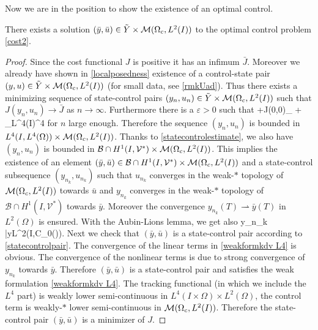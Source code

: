 Now we are in the position to show the existence of an optimal control.
\begin{proposition}
There exists a solution $(\bar y, \bar u)\in \tilde Y\times \mathcal{M}(\Omega_c, L^{2}(I)) $ to the optimal control problem \eqref{cost2}.
\end{proposition}
\begin{proof}
Since the cost functional $J$ is positive it has an infimum $\bar J$. Moreover we already have shown in \cref{localposedness} existence of a control-state pair $(y,u)\in \tilde Y\times \mathcal{M}(\Omega_c, L^{2}(I))$ (for small data, see \cref{rmkUad}). Thus there exists a minimizing sequence of state-control pairs $(y_n,u_n) \in \tilde Y\times \mathcal{M}(\Omega_c, L^{2}(I))$ such that $J(y_n, u_n) \rightarrow \bar J$ as $n \rightarrow \infty$. Furthermore there is a $\varepsilon>0$ such that
\be
\varepsilon+J(0,0)\geq \alpha {}_{\M} +  _{L^4(I\times \Omega)}^4
\ee
for $n$ large enough. Therefore the sequence $(y_n,u_n)$ is bounded in $L^4(I,L^4(\Omega))\times \mathcal{M}(\Omega_c, L^{2}(I))$. Thanks to \cref{statecontrolestimate}, we also have $(y_n,u_n)$ is bounded in $\mathcal{B}\cap H^{1}(I, \mathcal{V}^{*})\times \mathcal{M}(\Omega_c, L^{2}(I))$. This implies the existence of an element $(\bar y, \bar u)\in \mathcal{B}\cap H^{1}(I, \mathcal{V}^{*})\times \mathcal{M}(\Omega_c, L^{2}(I))$ and a state-control subsequence $(y_{n_k},u_{n_k})$ such that $u_{n_k}$ converges in the weak-$*$ topology of $\mathcal{M}(\Omega_c, L^{2}(I))$ towards $\bar u$ and $y_{n_k}$ converges in the weak-$\ast$ topology of $\mathcal{B}\cap H^{1}(I, \mathcal{V}^{*})$ towards $\bar y$. Moreover the convergence $y_{n_k}(T) \rightharpoonup \bar y(T)$ in $L^2(\Omega)$ is ensured. With the Aubin-Lions lemma, we get also
\be
\nonumber
y_{n_k} \rightarrow \bar y\quad{}\quad L^2(I,\mathcal C_0(\Omega)).
\ee
Next we check that $(\bar y, \bar u)$ is a state-control pair according to \cref{statecontrolpair}. The convergence of the linear terms in \eqref{weakformkdv L4} is obvious. The convergence of the nonlinear terms is due to strong convergence of $y_{n_k}$ towards $\bar y$. %
Therefore $(\bar y, \bar u)$ is a state-control pair and satisfies the weak formulation \eqref{weakformkdv L4}. The tracking functional (in which we include the $L^4$ part) is weakly lower semi-continuous in $L^4(I\times \Omega)\times L^2(\Omega)$, the control term is weakly-$*$ lower semi-continuous in $\mathcal{M}(\Omega_c, L^{2}(I))$. Therefore the state-control pair $(\bar y, \bar u)$ is a minimizer of $J$.
\qquad\end{proof}
